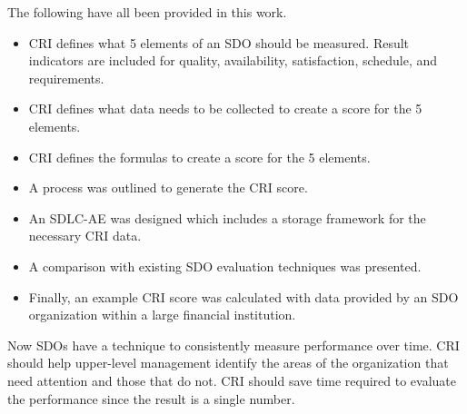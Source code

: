 \documentclass[SDSUThesis.tex]{subfiles}
\begin{document}
    The following have all been provided in this work.
    \begin{itemize}
        \item CRI defines what 5 elements of an SDO should be measured.
            Result indicators are included for quality, availability, satisfaction,
            schedule, and requirements. 
        \item CRI defines what data needs to be collected to create a 
            score for the 5 elements.
        \item CRI defines the formulas to create a score for the 5 elements.
        \item A process was outlined to generate the CRI score.
        \item An SDLC-AE was designed which includes a storage 
            framework for the necessary CRI data.
        \item A comparison with existing SDO evaluation techniques was presented.
        \item Finally, an example CRI score was calculated with data provided by
            an SDO organization within a large financial institution.
    \end{itemize}
    
    Now SDOs have a technique to consistently measure performance over time.  CRI
    should help upper-level management identify the areas of the organization
    that need attention and those that do not.  CRI should save time required to 
    evaluate the performance since the result is a single number.  
    
    
\end{document}
